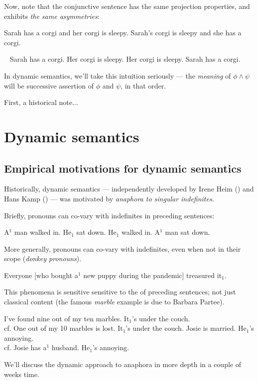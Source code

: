\documentclass[nols,twoside,nofonts,nobib,nohyper]{tufte-handout}
\theoremstyle{definition}
\begin{document}
Now, note that the conjunctive sentence has the same projection properties, and exhibits \textit{the same asymmetries}:

\pex
\a Sarah has a corgi and her corgi is sleepy.
\a\ljudge{\#}Sarah's corgi is sleepy and she has a corgi.
\xe

\pex~
\a Sarah has a corgi. Her corgi is sleepy.
\a\ljudge{\#} Her corgi is sleepy. Sarah has a corgi.
\xe

In dynamic semantics, we'll take this intuition seriously --- the \textit{meaning} of $ϕ ∧ ψ$ will be successive assertion of $ϕ$ and $ψ$, in that order.

First, a historical note...

\section{Dynamic semantics}

\subsection{Empirical motivations for dynamic semantics}

Historically, dynamic semantics --- independently developed by Irene Heim (\citeyear{Heim1982}) and Hans Kamp (\citeyear{Kamp1981}) --- was motivated by \textit{anaphora to singular indefinites}.

Briefly, pronouns can co-vary with indefinites in preceding sentences:

\pex
\a A$^{1}$ man walked in. He$_{1}$ sat down.
\a\ljudge{\#}He$_{1}$ walked in. A$^{1}$ man sat down.
\xe

More generally, pronouns can co-vary with indefinites, even when not in their scope (\textit{donkey pronouns}).

\ex Everyone [who bought a$^{1}$ new puppy during the pandemic] treasured it$_{1}$.
\xe

This phenomena is sensitive sensitive to the  of preceding sentences; not just classical content (the famous \textit{marble} example is due to Barbara Partee).

\pex
\a\ljudge{\#}I've found nine out of my ten marbles. It$_{1}$'s under the couch.\\
cf. One out of my 10 marbles is lost. It$_{1}$'s under the couch.
\a\ljudge{*}Josie is married. He$_{1}$'s annoying.\\
cf. Josie has a$^{1}$ husband. He$_{1}$'s annoying.
\xe

We'll discuss the dynamic approach to anaphora in more depth in a couple of weeks time.
\end{document}
